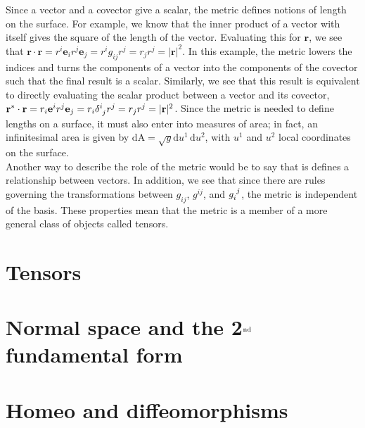 \begin{appendices}
Since a vector and a covector give a scalar, the metric defines notions of length on the surface.
For example, we know that the inner product of a vector with itself gives the square of the length of the vector.
Evaluating this for $\mathbf{r}$, we see that $\mathbf{r} \cdot \mathbf{r} = r^i \mathbf{e}_i r^j \mathbf{e}_j = r^i g_{ij} r^j = r_j r^j = |\mathbf{r}|^2$.
In this example, the metric lowers the indices and turns the components of a vector into the components of the covector such that the final result is a scalar.
Similarly, we see that this result is equivalent to directly evaluating the scalar product between a vector and its covector, $\mathbf{r}^* \cdot \mathbf{r} = r_i \mathbf{e}^i r^j \mathbf{e}_j = r_i \tensor{\delta}{^i_j} r^j = r_j r^j = |\mathbf{r}|^2$.
Since the metric is needed to define lengths on a surface, it must also enter into measures of area; in fact, an infinitesimal area is given by $\textrm{dA} = \sqrt{g}\textrm{d}u^1 \, \textrm{d}u^2$, with $u^1$ and $u^2$ local coordinates on the surface. \\

Another way to describe the role of the metric would be to say that is defines a relationship between vectors.
In addition, we see that since there are rules governing the transformations between $g_{ij}$, $g^{ij}$, and $\tensor{g}{_i^j}$, the metric is independent of the basis.
These properties mean that the metric is a member of a more general class of objects called tensors.




\section{Tensors}

\section{Normal space and the 2$^{\rm nd}$ fundamental form}

\section{Homeo and diffeomorphisms}

\end{appendices}
